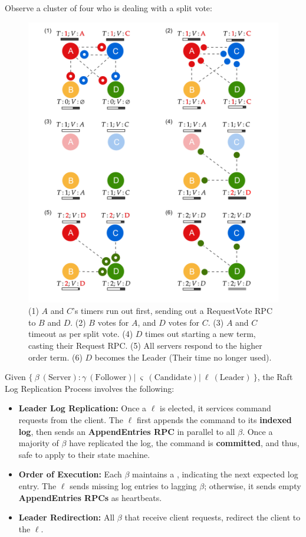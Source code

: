 \newpage

\noindent
Observe a cluster of four who is dealing with a split vote:
\begin{figure}[h]
    \centering
    \includegraphics[width=.9\textwidth]{Sections/raft/split.png}
    \caption{(1) $A$ and $C$'s timers run out first, sending out a RequestVote RPC to $B$ and $D$. (2) $B$ votes for $A$, and $D$ votes for $C$. (3) $A$ and $C$ timeout as per split vote. 
    (4) $D$ times out starting a new term, casting their Request RPC. (5) All servers respond to the higher order term. (6) $D$ becomes the Leader (Their time no longer used).}
\end{figure}

\newpage
\begin{Def}

    Given $\{\ \beta\ (\text{Server}): \gamma\ (\text{Follower})  |\ \varsigma\ (\text{Candidate}) |\ \ell\ (\text{Leader})\ \}$, the Raft Log Replication Process involves the following:
    \begin{itemize}
        \item \textbf{Leader Log Replication:} Once a $\ell$ is elected, it services command requests from the client. The $\ell$ first appends the command to its \textbf{indexed log},
        then sends an \textbf{AppendEntries RPC} in parallel to all $\beta$. Once a majority of $\beta$ have replicated the log, the command is \textbf{committed}, and thus, safe to apply to their state machine. 
        \item \textbf{Order of Execution:} Each $\beta$ maintains a ,
        indicating the next expected log entry. The $\ell$ sends missing log entries to lagging $\beta$; otherwise, it sends empty \textbf{AppendEntries RPCs} as heartbeats.
        \item \textbf{Leader Redirection:} All $\beta$ that receive client requests, redirect the client to the $\ell$. 
    \end{itemize}
\end{Def}

